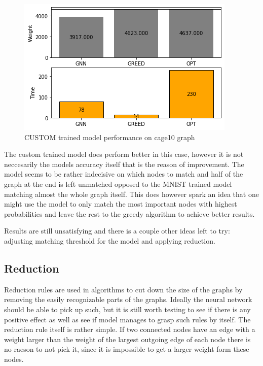 \begin{figure}[H]
    \centering
    \includegraphics[scale=1.0]{figures/CUSTOMtrainCAGE10}
    \caption{CUSTOM trained model performance on cage10 graph}
    \label{model performance}
\end{figure}

The custom trained model does perform better in this case, however it is not neccesarily the models accuracy itself that is the reason of improvement. The model seems to be rather indecisive on which nodes to match and half of the graph at the end is left unmatched opposed to the MNIST trained model matching almost the whole graph itself. This does however spark an idea that one might use the model to only match the most important nodes with highest probabilities and leave the rest to the greedy algorithm to achieve better results. 

Results are still unsatisfying and there is a couple other ideas left to try: adjusting matching threshold for the model and applying reduction.

\subsection{Reduction}

Reduction rules are used in algorithms to cut down the size of the graphs by removing the easily recognizable parts of the graphs. Ideally the neural network should be able to pick up such, but it is still worth testing to see if there is any positive effect as well as see if model manages to grasp such rules by itself. The reduction rule itself is rather simple. If two connected nodes have an edge with a weight larger than the weight of the largest outgoing edge of each node there is no raeson to not pick it, since it is impossible to get a larger weight form these nodes.

